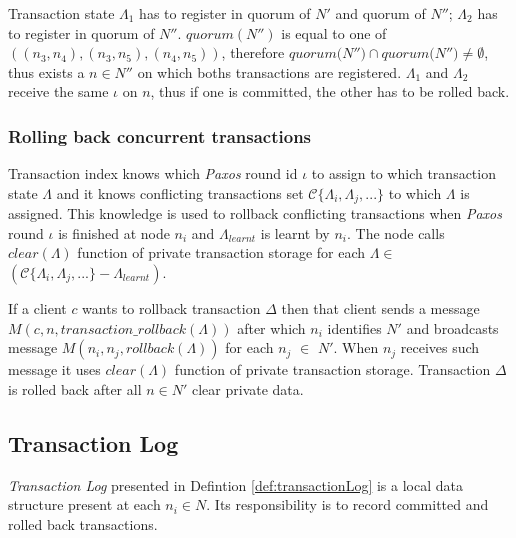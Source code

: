 \documentclass[runningheads,a4paper]{llncs}
\newcommand{\nodes}{$\mathit{N}$\xspace}
\newcommand{\nodesTx}{$\mathit{N'}$\xspace}
\newcommand{\transaction}{$\Delta$\xspace}
\newcommand{\txStates}{$\{\Lambda_{i}, \Lambda_{j}, ...\}$\xspace}
\newcommand{\txLog}{$\mathcal{L}$\xspace}
\newcommand{\conflictingTxSet}{$\mathcal{C}\text{\txStates}$\xspace}
\newcommand{\txRollbackMessage}{$\mathit{M}(c,n,\mathit{transaction\_rollback}(\Lambda))$\xspace}
\newcommand{\rollbackMessage}{$\mathit{M}(n_{i}, n_{j}, \mathit{rollback}(\Lambda))$\xspace}
\newcommand{\paxosRoundId}{$\iota$\xspace}
\newcommand{\txState}{$\Lambda$\xspace}
\newcommand{\txStatei}[1]{$\Lambda_{#1}$\xspace}
\newcommand{\txStateCommitted}{$\Lambda_{learnt}$\xspace}
\newcommand{\txIndex}{$\chi$\xspace}
\newcommand{\paxos}{\emph{Paxos}\xspace}
\newcommand{\mpt}{\emph{MPT}\xspace}
\newcommand{\client}{$c$\xspace}
\newcommand{\node}[1]{$n_{#1}$\xspace}
\begin{document}
Transaction state \txStatei{1} has to register in quorum of $N'$ and quorum of $N''$; \txStatei{2} has to register in quorum of $N''$.
$quorum(N'')$ is equal to one of $((n_3,n_4),(n_3,n_5),(n_4,n_5))$, therefore $\mathit{quorum(N''}) \cap \mathit{quorum(N''}) \neq \emptyset$, thus exists a $n\in N''$ on which boths transactions are registered.
\txStatei{1} and \txStatei{2} receive the same \paxosRoundId on $n$, thus if one is committed, the other has to be rolled back.

\subsubsection{Rolling back concurrent transactions}
Transaction index knows which \paxos round id \paxosRoundId to assign to which transaction state \txState and it knows conflicting transactions set \conflictingTxSet to which \txState is assigned. This knowledge is used to rollback conflicting transactions when \paxos round \paxosRoundId is finished at node \node{i} and \txStateCommitted is learnt by \node{i}. The node calls $\mathit{clear}(\text{\txState})$ function of private transaction storage for each \mbox{\txState $\in$ $(\text{\conflictingTxSet} - \text{\txStateCommitted})$}.

If a client \client wants to rollback transaction \transaction then that client
sends a message \txRollbackMessage after which \node{i} identifies \nodesTx and broadcasts message \rollbackMessage for each \node{j} $\in$ \nodesTx. When \node{j} receives such message it
uses $\mathit{clear}(\text{\txState})$ function of private transaction storage. Transaction \transaction is rolled back after all 
\mbox{$n\in \text{\nodesTx}$} clear private data.

\subsection{Transaction Log}
\label{sec:mpp:transactionLog}
\emph{Transaction Log} presented in Defintion \ref{def:transactionLog} is a local data structure present at each \node{i}$\in\text{\nodes}$. Its responsibility is to record committed and rolled back transactions. 

\end{document}
